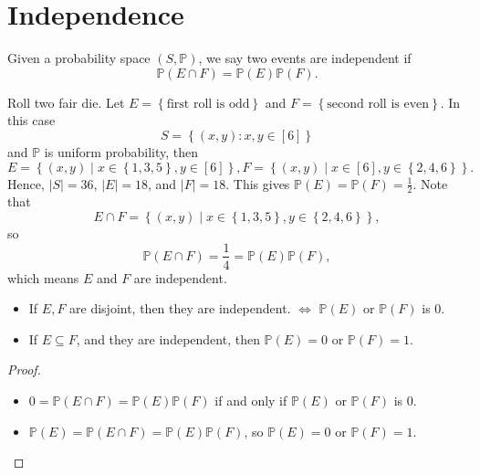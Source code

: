 \section{Independence}
\begin{definition}
    Given a probability space \((S, \mathbb{P} )\), we say two events are independent if
    \[
        \mathbb{P} (E \cap F) = \mathbb{P} (E) \mathbb{P} (F).
    \]  
\end{definition}

\begin{eg}
    Roll two fair die. Let \(E = \left\{ \text{first roll is odd} \right\} \) and \(F = \left\{ \text{second roll is even}  \right\} \). In this case
    \[
        S=\left\{ (x, y): x, y \in [6] \right\} 
    \]  
    and \(\mathbb{P} \) is uniform probability, then 
    \[
        E = \left\{ (x, y) \mid x \in \left\{ 1, 3, 5 \right\}, y \in [6]  \right\}, F = \left\{ (x, y) \mid x \in [6], y \in \left\{ 2, 4, 6 \right\}  \right\}.  
    \]
    Hence, \(\vert S \vert = 36 \), \(\vert E \vert = 18\), and \(\vert F \vert = 18 \). This gives \(\mathbb{P} (E) = \mathbb{P} (F) = \frac{1}{2}\). Note that 
    \[
        E \cap F = \left\{ (x, y) \mid x \in \left\{ 1, 3, 5 \right\}, y \in \left\{ 2, 4, 6 \right\}   \right\}, 
    \]     
    so 
    \[
        \mathbb{P} (E \cap F) = \frac{1}{4} = \mathbb{P} (E) \mathbb{P} (F),
    \]
    which means \(E\) and \(F\) are independent.  
\end{eg}

\begin{proposition}
    \hfill 
    \begin{itemize}
        \item [(1)] If \(E, F\) are disjoint, then they are independent. \(\iff \) \(\mathbb{P} (E)\) or \(\mathbb{P} (F)\) is \(0\). 
        \item [(2)] If \(E \subseteq F\), and they are independent, then \(\mathbb{P} (E) = 0\) or \(\mathbb{P} (F) = 1\).       
    \end{itemize}
\end{proposition}
\begin{proof}
\hfill
    \begin{itemize}
        \item [(1)] \(0 = \mathbb{P} (E \cap F) = \mathbb{P} (E) \mathbb{P} (F)\) if and only if \(\mathbb{P} (E)\) or \(\mathbb{P} (F)\) is \(0\).
        \item [(2)] \(\mathbb{P} (E) = \mathbb{P} (E \cap F) = \mathbb{P} (E) \mathbb{P} (F)\), so \(\mathbb{P} (E) = 0\) or \(\mathbb{P} (F) = 1\).      
    \end{itemize}
\end{proof}

